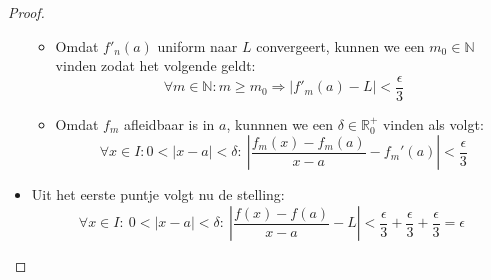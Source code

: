 \documentclass[main.tex]{subfiles}
\begin{document}
\begin{bst}
\begin{proof}
\begin{itemize}
\begin{itemize}
      \item 
        Omdat $f'_{n}(a)$ uniform naar $L$ convergeert, kunnen we een $m_{0} \in \mathbb{N}$ vinden zodat het volgende geldt:
        \[ \forall m\in \mathbb{N}: m \ge m_{0} \Rightarrow \left| f'_{m}(a) - L \right| < \frac{\epsilon}{3}\]
      \item 
        Omdat $f_{m}$ afleidbaar is in $a$, kunnnen we een $\delta \in \mathbb{R}_{0}^{+}$ vinden  als volgt:
        \[ \forall x\in I: 0 < |x-a| < \delta:\ \left| \frac{f_{m}(x)-f_{m}(a)}{x-a} - f_{m}'(a) \right| < \frac{\epsilon}{3} \]
      \end{itemize}
    \item Uit het eerste puntje volgt nu de stelling:
      \[ \forall x\in I:\ 0 < |x-a| < \delta:\ \left| \frac{f(x)-f(a)}{x-a} - L \right|  < \frac{\epsilon}{3}+\frac{\epsilon}{3} +\frac{\epsilon}{3} = \epsilon \]
    \end{itemize}
  \end{proof}
\end{bst}
\end{document}
